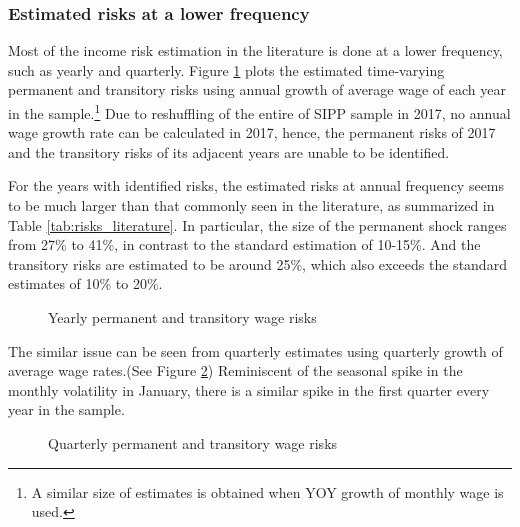 \subsubsection{Estimated risks at a lower frequency}
\label{appendix:quarter_year_risk_est}

Most of the income risk estimation in the literature is done at a lower frequency, such as yearly and quarterly. Figure \ref{fig:decomposed_yearly} plots the estimated time-varying permanent and transitory risks using annual growth of average wage of each year in the sample.\footnote{A similar size of estimates is obtained when YOY growth of monthly wage is used.} Due to reshuffling of the entire of SIPP sample in 2017, no annual wage growth rate can be calculated in 2017, hence, the permanent risks of 2017 and the transitory risks of its adjacent years are unable to be identified.  

For the years with identified risks, the estimated risks at annual frequency seems to be much larger than that commonly seen in the literature, as summarized in Table \ref{tab:risks_literature}. In particular, the size of the permanent shock ranges from 27\% to 41\%, in contrast to the standard estimation of 10-15\%. And the transitory risks are estimated to be around 25\%, which also exceeds the standard estimates of 10\% to 20\%. 

 \begin{figure}[!ht]
    	\caption{Yearly permanent and transitory wage risks}
    	\label{fig:decomposed_yearly}
    	\begin{center}
    	\end{center}
    \end{figure}
    
The similar issue can be seen from quarterly estimates using quarterly growth of average wage rates.(See Figure \ref{fig:decomposed_quarterly}) Reminiscent of the seasonal spike in the monthly volatility in January, there is a similar spike in the first quarter every year in the sample.    

 \begin{figure}[!ht]
    	\caption{Quarterly permanent and transitory wage risks}
    	\label{fig:decomposed_quarterly}
    	\begin{center}
    	\end{center}
    \end{figure}
    

